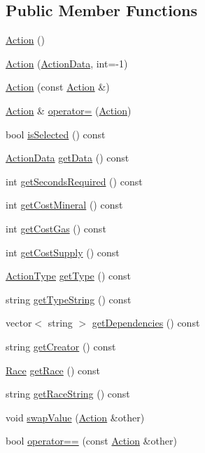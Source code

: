 \subsection*{Public Member Functions}
\begin{DoxyCompactItemize}
\item 
\hyperlink{classghost_1_1Action_a82c7d6aec3d39fd036395fcf563fd2c5}{Action} ()
\item 
\hyperlink{classghost_1_1Action_adc2c133b69485f5e10e3f2d16528bd15}{Action} (\hyperlink{structghost_1_1ActionData}{Action\-Data}, int=-\/1)
\item 
\hyperlink{classghost_1_1Action_af83e86975dc608cb9ebe7447fa2b368a}{Action} (const \hyperlink{classghost_1_1Action}{Action} \&)
\item 
\hyperlink{classghost_1_1Action}{Action} \& \hyperlink{classghost_1_1Action_a56179a064666c0b895daa0006ebe26d1}{operator=} (\hyperlink{classghost_1_1Action}{Action})
\item 
bool \hyperlink{classghost_1_1Action_a3a9c93b2d9ba2181e74fddceaec84a34}{is\-Selected} () const 
\item 
\hyperlink{structghost_1_1ActionData}{Action\-Data} \hyperlink{classghost_1_1Action_ac03ae59ff4bba11290689ba2898516e8}{get\-Data} () const 
\item 
int \hyperlink{classghost_1_1Action_a0a434058b17b4235ffd2325c88056751}{get\-Seconds\-Required} () const 
\item 
int \hyperlink{classghost_1_1Action_ad8f83b004d632ef058e2aced097af7f0}{get\-Cost\-Mineral} () const 
\item 
int \hyperlink{classghost_1_1Action_a46881c65b49922ee92afa96ac2c38d17}{get\-Cost\-Gas} () const 
\item 
int \hyperlink{classghost_1_1Action_ae1f8a3db9caafbcaa2039600f11eafd7}{get\-Cost\-Supply} () const 
\item 
\hyperlink{namespaceghost_a7c0deb8266504feb7d025903f2b77693}{Action\-Type} \hyperlink{classghost_1_1Action_a3d80b97f17c4e29a23a19962d8adfaa6}{get\-Type} () const 
\item 
string \hyperlink{classghost_1_1Action_a806f43d37dfd110a1ed88e643db9845d}{get\-Type\-String} () const 
\item 
vector$<$ string $>$ \hyperlink{classghost_1_1Action_a8396f1b683a8d6a20c5007aab5e1c02b}{get\-Dependencies} () const 
\item 
string \hyperlink{classghost_1_1Action_a7e9e96cdfbc4ed561d782d2af51fb1ab}{get\-Creator} () const 
\item 
\hyperlink{namespaceghost_a8b1db75c40c6980adcf244ddccc0324b}{Race} \hyperlink{classghost_1_1Action_a67245bd8400e2dc6db7f16b512df145d}{get\-Race} () const 
\item 
string \hyperlink{classghost_1_1Action_ab22270eb1800b12ca2d2d6259552d974}{get\-Race\-String} () const 
\item 
void \hyperlink{classghost_1_1Action_a2928069f4b38a67ec7a955ee9e7783f2}{swap\-Value} (\hyperlink{classghost_1_1Action}{Action} \&other)
\item 
bool \hyperlink{classghost_1_1Action_aec7e9119cc76fe0aecbd1b43fd35915a}{operator==} (const \hyperlink{classghost_1_1Action}{Action} \&other)
\end{DoxyCompactItemize}
